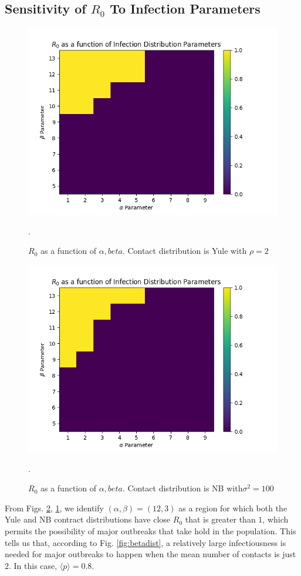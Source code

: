 \documentclass[11pt, twocolumn]{article}
\begin{document}
\subsection{Sensitivity of $R_0$ To Infection Parameters}
\begin{figure}
	\centering
	\includegraphics[scale=0.5]{YuleNoVaccSweep.png}
	\caption{$R_0$ as a function of $\alpha, beta$. Contact distribution is Yule with $\rho=2$}.
		\label{fig:yulesweep}
\end{figure}
\begin{figure}
	\centering
	\includegraphics[scale=0.5]{NBNoVaccSweep.png}
	\caption{$R_0$ as a function of $\alpha, beta$. Contact distribution is NB with$\sigma^2=100$}.
	\label{fig:nbsweep}
\end{figure}
From Figs. \ref{fig:nbsweep}, \ref{fig:yulesweep}, we identify $(\alpha, \beta)=(12, 3)$ as a region for which both the Yule and NB contract distributions have close $R_0$ that is greater than $1$, which permits the possibility of major outbreaks that take hold in the population. This tells us that, according to Fig. \ref{fig:betadist}, a relatively large infectiousness is needed for major outbreaks to happen when the mean number of contacts is just $2$. In this case, $\langle p\rangle=0.8$.\\ \\
\end{document}
